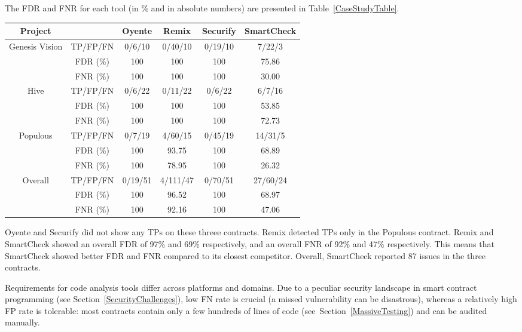 The FDR and FNR for each tool (in \% and in absolute numbers) are presented in Table~\ref{CaseStudyTable}.
\begin{table*}[t]
	\centering
	\caption{Tools results on the three projects and overall}
	\begin{tabular}{|c|c|c|c|c|c|}
		\hline
		\textbf{Project} &  & \textbf{Oyente} & \textbf{Remix} & \textbf{Securify} & \textbf{SmartCheck} \\
		\hline
		\multirow{3}{*}{Genesis Vision}
			& TP/FP/FN & 0/6/10 & 0/40/10 & 0/19/10 & 7/22/3 \\
			& FDR (\%) & 100 & 100 & 100 & 75.86 \\
			& FNR (\%) & 100 & 100 & 100 & 30.00 \\
		\hline
		\multirow{3}{*}{Hive}
			& TP/FP/FN & 0/6/22 & 0/11/22 & 0/6/22 & 6/7/16 \\
			& FDR (\%) & 100 & 100 & 100 & 53.85 \\
			& FNR (\%) & 100 & 100 & 100 & 72.73 \\
		\hline
		\multirow{3}{*}{Populous}
			& TP/FP/FN & 0/7/19 & 4/60/15 & 0/45/19 & 14/31/5 \\
			& FDR (\%) & 100 & 93.75 & 100 & 68.89 \\
			& FNR (\%) & 100 & 78.95 & 100 & 26.32 \\
		\hline
		\multirow{3}{*}{Overall}
			& TP/FP/FN & 0/19/51 & 4/111/47 & 0/70/51 & 27/60/24 \\
			& FDR (\%) & 100 & 96.52 & 100 & 68.97 \\
			& FNR (\%) & 100 & 92.16 & 100 & 47.06 \\
		\hline
	\end{tabular}
	\label{CaseStudyTable}
\end{table*}

Oyente and Securify did not show any TPs on these threee contracts.
Remix detected TPs only in the Populous contract.
Remix and SmartCheck showed an overall FDR of 97\% and 69\% respectively, and an overall FNR of 92\% and 47\% respectively.
This means that SmartCheck showed better FDR and FNR compared to its closest competitor.
Overall, SmartCheck reported 87 issues in the three contracts.


Requirements for code analysis tools differ across platforms and domains.
Due to a peculiar security landscape in smart contract programming (see Section~\ref{SecurityChallenges}), low FN rate is crucial (a missed vulnerability can be disastrous), whereas a relatively high FP rate is tolerable: most contracts contain only a few hundreds of lines of code (see~Section~\ref{MassiveTesting}) and can be audited manually.

